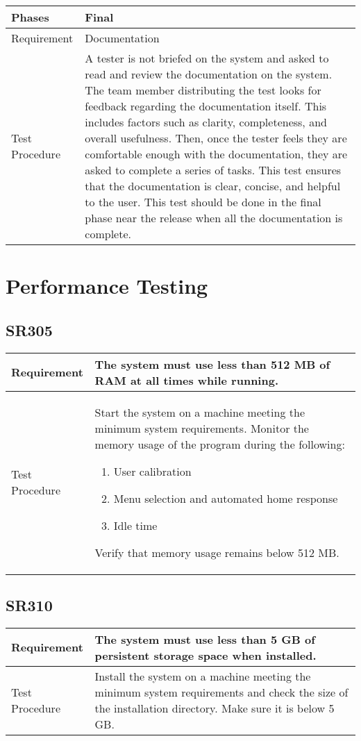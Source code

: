\documentclass{article}
\begin{document}
\begin{tabular}{| l | p{12cm}  |}
    \hline
	Phases & Final \\ \hline
	Requirement & Documentation \\ \hline
	Test Procedure & A tester is not briefed on the system and asked to read
	and review the documentation on the system. The team member distributing
	the test looks for feedback regarding the documentation itself. This
	includes factors such as clarity, completeness, and overall usefulness.
	Then, once the tester feels they are comfortable enough with the
	documentation, they are asked to complete a series of tasks. This test
	ensures that the documentation is clear, concise, and helpful to the user.
	This test should be done in the final phase near the release when all the
	documentation is complete. \\ \hline

\end{tabular}


\newpage

\section{Performance Testing}
\subsection{SR305}
\begin{tabular}{| l | p{12cm}  |}
    \hline
	Requirement & The system must use less than 512 MB of RAM at all times while running. \\ \hline
	Test Procedure & Start the system on a machine meeting the minimum system
	requirements. Monitor the memory usage of the program during the
	following:
	\begin{enumerate}
	    \item User calibration
	    \item Menu selection and automated home response
	    \item Idle time
	\end{enumerate}
	Verify that memory usage remains below 512 MB. \\ \hline
\end{tabular}
\subsection{SR310}
\begin{tabular}{| l | p{12cm}  |}
    \hline
	Requirement & The system must use less than 5 GB of persistent storage
	space when installed. \\ \hline
	Test Procedure & Install the system on a machine meeting the minimum
	system requirements and check the size of the installation directory. Make
	sure it is below 5 GB. \\ \hline
\end{tabular}
\end{document}
